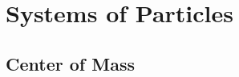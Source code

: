 \section{Systems of Particles} \label{sec:Systems of Particles}

\subsection{Center of Mass} \label{subsec:Center of Mass}